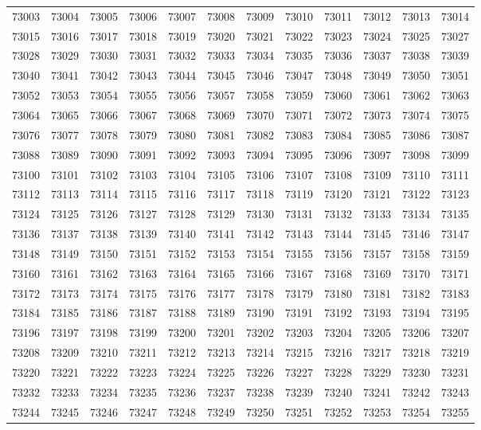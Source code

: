 \begin{center}
\begin{longtable}{llllllllllll}
73003 &73004 &73005 &73006 &73007 &73008 &73009 &73010 &73011 &73012 &73013 &73014 \\
73015 &73016 &73017 &73018 &73019 &73020 &73021 &73022 &73023 &73024 &73025 &73027 \\
73028 &73029 &73030 &73031 &73032 &73033 &73034 &73035 &73036 &73037 &73038 &73039 \\
73040 &73041 &73042 &73043 &73044 &73045 &73046 &73047 &73048 &73049 &73050 &73051 \\
73052 &73053 &73054 &73055 &73056 &73057 &73058 &73059 &73060 &73061 &73062 &73063 \\
73064 &73065 &73066 &73067 &73068 &73069 &73070 &73071 &73072 &73073 &73074 &73075 \\
73076 &73077 &73078 &73079 &73080 &73081 &73082 &73083 &73084 &73085 &73086 &73087 \\
73088 &73089 &73090 &73091 &73092 &73093 &73094 &73095 &73096 &73097 &73098 &73099 \\
73100 &73101 &73102 &73103 &73104 &73105 &73106 &73107 &73108 &73109 &73110 &73111 \\
73112 &73113 &73114 &73115 &73116 &73117 &73118 &73119 &73120 &73121 &73122 &73123 \\
73124 &73125 &73126 &73127 &73128 &73129 &73130 &73131 &73132 &73133 &73134 &73135 \\
73136 &73137 &73138 &73139 &73140 &73141 &73142 &73143 &73144 &73145 &73146 &73147 \\
73148 &73149 &73150 &73151 &73152 &73153 &73154 &73155 &73156 &73157 &73158 &73159 \\
73160 &73161 &73162 &73163 &73164 &73165 &73166 &73167 &73168 &73169 &73170 &73171 \\
73172 &73173 &73174 &73175 &73176 &73177 &73178 &73179 &73180 &73181 &73182 &73183 \\
73184 &73185 &73186 &73187 &73188 &73189 &73190 &73191 &73192 &73193 &73194 &73195 \\
73196 &73197 &73198 &73199 &73200 &73201 &73202 &73203 &73204 &73205 &73206 &73207 \\
73208 &73209 &73210 &73211 &73212 &73213 &73214 &73215 &73216 &73217 &73218 &73219 \\
73220 &73221 &73222 &73223 &73224 &73225 &73226 &73227 &73228 &73229 &73230 &73231 \\
73232 &73233 &73234 &73235 &73236 &73237 &73238 &73239 &73240 &73241 &73242 &73243 \\
73244 &73245 &73246 &73247 &73248 &73249 &73250 &73251 &73252 &73253 &73254 &73255 \\

\end{longtable}
\end{center}
